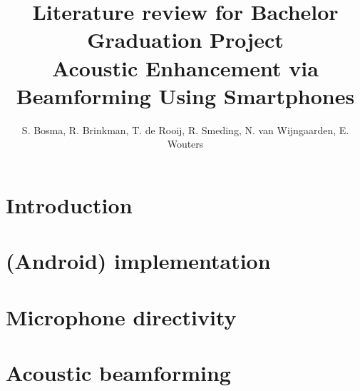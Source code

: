 \documentclass[a4paper]{article}
\begin{document}
\title{{\sffamily Literature review for Bachelor Graduation Project\\Acoustic Enhancement via Beamforming Using Smartphones}}
\author{{\sffamily\small S. Bosma, R. Brinkman, T. de Rooij, R. Smeding, N. van Wijngaarden, E. Wouters}}
\date{}
\maketitle
\section{Introduction}
\label{sec:introduction}


\section{(Android) implementation}
\label{sec:android}


\section{Microphone directivity}
\label{sec:microphone}


\section{Acoustic beamforming}
\label{sec:beamforming}


\newpage
{}
\label{sec:bibliography}

\end{document}
